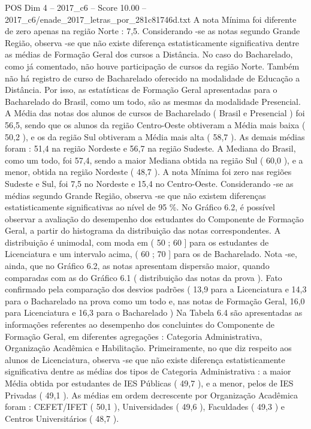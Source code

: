 \begin{textsample}{POS Dim 4 – 2017\_c6 – Score 10.00 – 2017\_c6/enade\_2017\_letras\_por\_281c81746d.txt}
A nota Mínima foi diferente de zero apenas na região Norte : 7,5.
Considerando -se as notas segundo Grande Região, observa -se que não existe diferença estatisticamente significativa dentre as médias de Formação Geral dos cursos a Distância.
No caso do Bacharelado, como já comentado, não houve participação de cursos da região Norte.
Também não há registro de curso de Bacharelado oferecido na modalidade de Educação a Distância.
Por isso, as estatísticas de Formação Geral apresentadas para o Bacharelado do Brasil, como um todo, são as mesmas da modalidade Presencial.
A Média das notas dos alunos de cursos de Bacharelado ( Brasil e Presencial ) foi 56,5, sendo que os alunos da região Centro-Oeste obtiveram a Média mais baixa ( 50,2 ), e os da região Sul obtiveram a Média mais alta ( 58,7 ).
As demais médias foram : 51,4 na região Nordeste e 56,7 na região Sudeste.
A Mediana do Brasil, como um todo, foi 57,4, sendo a maior Mediana obtida na região Sul ( 60,0 ), e a menor, obtida na região Nordeste ( 48,7 ).
A nota Mínima foi zero nas regiões Sudeste e Sul, foi 7,5 no Nordeste e 15,4 no Centro-Oeste.
Considerando -se as médias segundo Grande Região, observa -se que não existem diferenças estatisticamente significativas ao nível de 95 \%.
No Gráfico 6.2, é possível observar a avaliação do desempenho dos estudantes do Componente de Formação Geral, a partir do histograma da distribuição das notas correspondentes.
A distribuição é unimodal, com moda em ( 50 ; 60 ] para os estudantes de Licenciatura e um intervalo acima, ( 60 ; 70 ] para os de Bacharelado.
Nota -se, ainda, que no Gráfico 6.2, as notas apresentam dispersão maior, quando comparadas com as do Gráfico 6.1 ( distribuição das notas da prova ).
Fato confirmado pela comparação dos desvios padrões ( 13,9 para a Licenciatura e 14,3 para o Bacharelado na prova como um todo e, nas notas de Formação Geral, 16,0 para Licenciatura e 16,3 para o Bacharelado ) Na Tabela 6.4 são apresentadas as informações referentes ao desempenho dos concluintes do Componente de Formação Geral, em diferentes agregações : Categoria Administrativa, Organização Acadêmica e Habilitação.
Primeiramente, no que diz respeito aos alunos de Licenciatura, observa -se que não existe diferença estatisticamente significativa dentre as médias dos tipos de Categoria Administrativa : a maior Média obtida por estudantes de IES Públicas ( 49,7 ), e a menor, pelos de IES Privadas ( 49,1 ).
As médias em ordem decrescente por Organização Acadêmica foram : CEFET/IFET ( 50,1 ), Universidades ( 49,6 ), Faculdades ( 49,3 ) e Centros Universitários ( 48,7 ).

\end{textsample}

